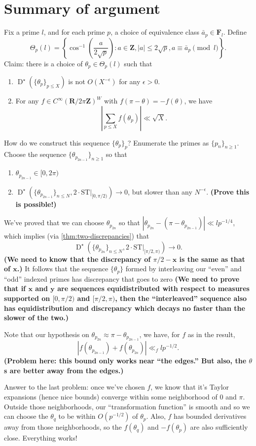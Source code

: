 \documentclass{article}
\DeclareMathOperator{\disc}{D}
\newcommand{\bF}{\mathbf{F}}
\newcommand{\bR}{\mathbf{R}}
\newcommand{\bx}{{\boldsymbol x}}
\newcommand{\by}{{\boldsymbol y}}
\newcommand{\bZ}{\mathbf{Z}}
\newcommand{\ST}{\mathrm{ST}}
\begin{document}
\section{Summary of argument}

Fix a prime $l$, and for each prime $p$, a choice of equivalence class 
$\bar a_p \in \bF_l$. Define 
\[
	\Theta_p(l) = \left\{ \cos^{-1}\left( \frac{a}{2\sqrt p}\right) : a\in \bZ, |a|\leqslant 2\sqrt p, a\equiv \bar a_p \pmod l\right\} .
\]
Claim: there is a choice of $\theta_p\in \Theta_p(l)$ such that 
\begin{enumerate}
\item
$\disc^\star(\{\theta_p\}_{p\leqslant X})$ is not $O(X^{-\epsilon})$ for any 
$\epsilon>0$. 

\item
For any $f\in C^\infty(\bR/2\pi \bZ)^W$ with $f(\pi-\theta) = -f(\theta)$, we 
have 
\[
	\left| \sum_{p\leqslant X} f(\theta_p)\right| \ll \sqrt X .
\]
\end{enumerate}

How do we construct this sequence $\{\theta_p\}_p$? Enumerate the primes as 
$\{p_n\}_{n\geqslant 1}$. Choose the sequence 
$\{\theta_{p_{2 n-1}}\}_{n\geqslant 1}$ so that 
\begin{enumerate}
\item
$\theta_{p_{2n-1}}\in [0,2\pi)$
\item
$\disc^\star\left(\{\theta_{p_{2n-1}}\}_{n\leqslant N}, 2\cdot \ST|_{[0,\pi/2)}\right) \to 0$, but slower 
than any $N^{-\epsilon}$. \textbf{(Prove this is possible!)} 
\end{enumerate}
We've proved that we can choose $\theta_{p_{2n}}$ so that 
$|\theta_{p_{2n}} - (\pi - \theta_{p_{2n-1}})| \ll l p^{-1/4}$, which 
implies (via \autoref{thm:two-discrepancies}) that 
\[
	\disc^\star\left(\{\theta_{p_{2n}}\}_{n\leqslant N}, 2\cdot \ST|_{[\pi/2,\pi)}\right) \to 0 .
\]
\textbf{(We need to know that the discrepancy of $\pi/2-\bx$ is the same as 
that of $\bx$.)} It follows that the sequence $\{\theta_p\}$ formed by 
interleaving our ``even'' and ``odd'' indexed primes has discrepancy that 
goes to zero \textbf{(We need to prove that if $\bx$ and $\by$ are sequences 
equidistributed with respect to measures supported on $[0,\pi/2)$ and 
$[\pi/2,\pi)$, then the ``interleaved'' sequence also has equidistribution 
and discrepancy which decays no faster than the slower of the two.)}

Note that our hypothesis on $\theta_{p_{2n}}\approx \pi - \theta_{p_{2n-1}}$, 
we have, for $f$ as in the result,  
\[
	|f(\theta_{p_{2n-1}}) + f(\theta_{p_{2n}})| \ll_f l p^{-1/2} .
\]
\textbf{(Problem here: this bound only works near ``the edges.'' But also, 
the $\theta$s are better away from the edges.)}

Answer to the last problem: once we've chosen $f$, we know that it's Taylor 
expansions (hence nice bounds) converge within some neighborhood of $0$ and 
$\pi$. Outside those neighborhoods, our ``transformation function'' is smooth 
and so we can choose the $\theta_q$ to be within $O(p^{-1/2})$ of $\theta_p$. 
Also, $f$ has bounded derivatives away from those neighborhoods, so the 
$f(\theta_q)$ and $-f(\theta_p)$ are also sufficiently close. Everything works!
\end{document}
